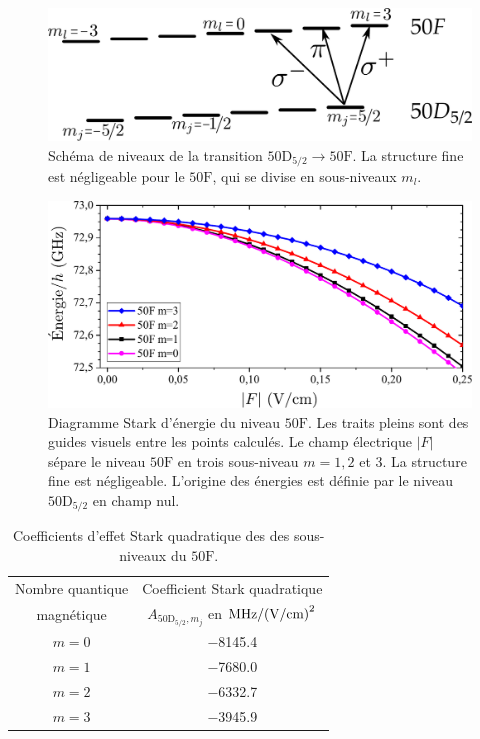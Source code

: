 \begin{figure}[!h]
\centering
\includegraphics[width=0.7\linewidth]{figures/circulars/levels_50D50F}
\caption[Schéma de niveaux de la transition $\mathrm{50D\rightarrow 50F}$]{
Schéma de niveaux de la transition $\mathrm{50D_{5/2}\rightarrow 50F}$.
La structure fine est négligeable pour le $\mathrm{50F}$, qui se divise en sous-niveaux $m_l$.
}
\label{fig:levels_50D50F}
\end{figure}
%
\begin{figure}[!h]
\centering
\includegraphics[width=\linewidth]{figures/circulars/Stark50F}
\caption[Diagramme Stark d'énergie du niveau $\mathrm{50F}$]{
Diagramme Stark d'énergie du niveau $\mathrm{50F}$.
Les traits pleins sont des guides visuels entre les points calculés.
Le champ électrique $|F|$ sépare le niveau $\mathrm{50F}$ en trois sous-niveau $m=1,2$ et $3$.
La structure fine est négligeable.
L'origine des énergies est définie par le niveau $\mathrm{50D}_{5/2}$ en champ nul.
}
\label{fig:Stark50F}
\end{figure}
%
\begin{table}[!h]
	\centering
	\caption[Effet Stark quadratique des sous-niveaux du $\mathrm{50F}$]{Coefficients d'effet Stark quadratique des des sous-niveaux du $\mathrm{50F}$.
	}
	\label{tab:Stark_50F}
	\begin{tabular}{c c }
		\toprule\midrule
		Nombre quantique
		& Coefficient Stark quadratique
		\\
		magnétique
		& $A_{\mathrm{50D}_{5/2},m_j}$ en $\si{\MHz \per (\V \per\cm) \squared}$ \\
		\midrule
		$m=0$
		& \SI{-8145.4}{} \\
		$m=1$
		& \SI{-7680.0}{} \\
		$m=2$
		& \SI{-6332.7}{} \\
		$m=3$
		& \SI{-3945.9}{} \\
		\midrule
		\bottomrule
 	\end{tabular}
\end{table}
%


